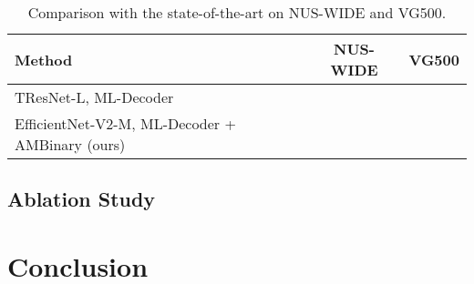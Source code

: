 \documentclass[runningheads]{llncs}
\begin{document}
\begin{table}
  \caption{Comparison with the state-of-the-art on NUS-WIDE and VG500.}
  \label{tab:results_others}
  \centering
  \begin{tabular}{l|c|c}
    Method & NUS-WIDE & VG500\\ \hline
    TResNet-L, ML-Decoder &  & \\
    \hline
    EfficientNet-V2-M, ML-Decoder + AMBinary (ours) &  &  \\
  \end{tabular}
\end{table}

\subsection{Ablation Study}

\section{Conclusion}

%
%
%


% 
\end{document}

